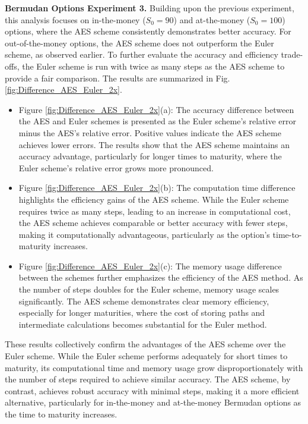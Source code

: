 \documentclass[]{interact}
\theoremstyle{plain}%
\theoremstyle{definition}
\theoremstyle{remark}
\begin{document}
\textbf{Bermudan Options Experiment 3.} Building upon the previous experiment, this analysis focuses on in-the-money (\( S_0 = 90 \)) and at-the-money (\( S_0 = 100 \)) options, where the AES scheme consistently demonstrates better accuracy. For out-of-the-money options, the AES scheme does not outperform the Euler scheme, as observed earlier. To further evaluate the accuracy and efficiency trade-offs, the Euler scheme is run with twice as many steps as the AES scheme to provide a fair comparison. The results are summarized in Fig. \ref{fig:Difference_AES_Euler_2x}.

\begin{itemize}
    \item Figure \ref{fig:Difference_AES_Euler_2x}(a): The accuracy difference between the AES and Euler schemes is presented as the Euler scheme's relative error minus the AES's relative error. Positive values indicate the AES scheme achieves lower errors. The results show that the AES scheme maintains an accuracy advantage, particularly for longer times to maturity, where the Euler scheme’s relative error grows more pronounced.
    
    \item Figure \ref{fig:Difference_AES_Euler_2x}(b): The computation time difference highlights the efficiency gains of the AES scheme. While the Euler scheme requires twice as many steps, leading to an increase in computational cost, the AES scheme achieves comparable or better accuracy with fewer steps, making it computationally advantageous, particularly as the option’s time-to-maturity increases.
    
    \item Figure \ref{fig:Difference_AES_Euler_2x}(c): The memory usage difference between the schemes further emphasizes the efficiency of the AES method. As the number of steps doubles for the Euler scheme, memory usage scales significantly. The AES scheme demonstrates clear memory efficiency, especially for longer maturities, where the cost of storing paths and intermediate calculations becomes substantial for the Euler method.
\end{itemize}

These results collectively confirm the advantages of the AES scheme over the Euler scheme. While the Euler scheme performs adequately for short times to maturity, its computational time and memory usage grow disproportionately with the number of steps required to achieve similar accuracy. The AES scheme, by contrast, achieves robust accuracy with minimal steps, making it a more efficient alternative, particularly for in-the-money and at-the-money Bermudan options as the time to maturity increases.
\end{document}
